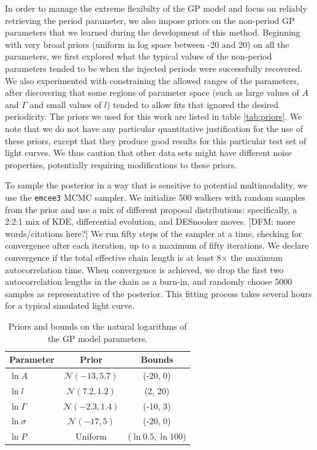 \documentclass[useAMS, usenatbib, preprint, 12pt]{aastex}
\begin{document}
In order to manage the extreme flexibilty of the GP model and focus on 
reliably retrieving the period parameter, we also impose priors
on the non-period GP parameters that we 
learned during the development of this method.  
Beginning with very broad priors (uniform in log space between 
-20 and 20) on all the parameters, we first explored what the 
typical values of the non-period parameters tended to be when the 
injected periods were successfully recovered.  We also experimented with
constraining the allowed ranges of the parameters, after discovering 
that some regions of parameter space (such as large values of $A$ and $\Gamma$
and small values of $l$) tended to allow fits that ignored the desired
periodicity.  The priors we used for this work are listed in
table \ref{tab:priors}.  We note that we do not have any particular
quantitative justification for the use of these priors,
except that they produce good results for this particular test set of 
light curves.  We thus caution that other data sets might have different
noise properties, potentially requiring modifications to these priors.

To sample the posterior in a way that is sensitive to potential 
multimodality, we use the \texttt{emcee3} MCMC sampler.
We initialize 500 walkers with random samples from the prior 
 and use a mix of different proposal distributions: 
specifically, a 2:2:1 mix of KDE, differential evolution, and DESnooker moves. 
[DFM: more words/citations here?]  
We run fifty steps of the sampler at a time, checking for convergence after 
each iteration, up to a maximum of fifty iterations.  We declare convergence if 
the total effective chain length is at least 8$\times$ the maximum autocorrelation
time.  When convergence is achieved, we drop the first two autocorrelation 
lengths in the chain as a burn-in, and randomly choose 5000 samples as 
representative of the posterior.  This fitting process takes several hours 
for a typical simulated light curve.

\begin{table}
\begin{center}
\caption{Priors and bounds on the natural logarithms of the GP model parameters.}
\begin{tabular}{lcc}
Parameter & Prior & Bounds\\
    \hline
    $\ln A$ & $\mathcal N(-13, 5.7)$ & (-20, 0) \\
    $\ln l$ & $\mathcal N(7.2, 1.2)$ & (2, 20) \\
    $\ln \Gamma$ & $\mathcal N(-2.3, 1.4)$ & (-10, 3) \\
    $\ln \sigma$ & $\mathcal N(-17, 5)$ & (-20, 0) \\
    $\ln P $ & Uniform & ($\ln 0.5, \ln 100$) \\ 
\end{tabular}
\end{center}
\end{table}
\label{tab:priors}
\end{document}

